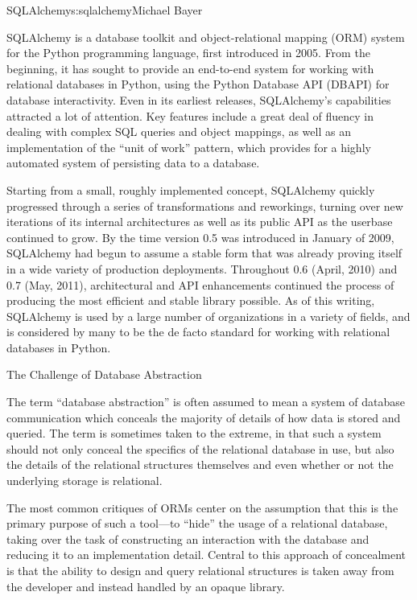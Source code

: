 \begin{aosachapter}{SQLAlchemy}{s:sqlalchemy}{Michael Bayer}

SQLAlchemy is a database toolkit and object-relational mapping (ORM) system
for the Python programming language, first introduced in 2005. From the
beginning, it has sought to provide an end-to-end system for working with
relational databases in Python, using the Python Database API (DBAPI) for
database interactivity. Even in its earliest releases, SQLAlchemy's
capabilities attracted a lot of attention. Key features include a great deal
of fluency in dealing with complex SQL queries and object mappings, as well as an
implementation of the ``unit of work'' pattern, which provides for a highly
automated system of persisting data to a database.

Starting from a small, roughly implemented concept, SQLAlchemy quickly
progressed through a series of transformations and reworkings, turning over
new iterations of its internal architectures as well as its public API as the
userbase continued to grow. By the time version 0.5 was introduced in January
of 2009, SQLAlchemy had begun to assume a stable form that was already proving
itself in a wide variety of production deployments. Throughout 0.6 (April,
2010) and 0.7 (May, 2011), architectural and API enhancements continued the
process of producing the most efficient and stable library possible. As of
this writing, SQLAlchemy is used by a large number of organizations in a
variety of fields, and is considered by many to be the de facto standard for
working with relational databases in Python.

\begin{aosasect1}{The Challenge of Database Abstraction}

The term ``database abstraction'' is often assumed to mean a system of database
communication which conceals the majority of details of how data is stored and
queried. The term is sometimes taken to the extreme, in that such a system
should not only conceal the specifics of the relational database in use, but
also the details of the relational structures themselves and even whether or
not the underlying storage is relational.

The most common critiques of ORMs center on the assumption that this is the
primary purpose of such a tool---to ``hide'' the usage of a relational database,
taking over the task of constructing an interaction with the database and
reducing it to an implementation detail.  Central to this approach of
concealment is that the ability to design and query relational structures is
taken away from the developer and instead handled by an opaque library.


\end{aosasect1}
\end{aosachapter}
